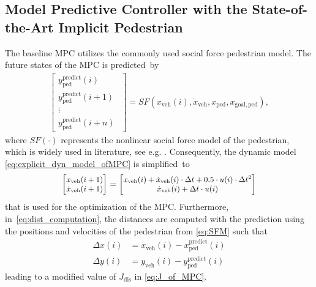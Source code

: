 \documentclass[conference]{IEEEtran}
\begin{document}
	\subsection{Model Predictive Controller with the State-of-the-Art Implicit Pedestrian}
	The baseline MPC utilizes the commonly used social force pedestrian model.
	The future states of the MPC is predicted~by
	\begin{align} \label{eq:SFM}
		\! \! \begin{bmatrix}
			y_\mathrm{ped}^\mathrm{predict}(i) \, \phantom{--} \\
			y_\mathrm{ped}^\mathrm{predict}(i+1) \\
			\vdots \\
			y_\mathrm{ped}^\mathrm{predict}(i+n)
		\end{bmatrix}
		=
		SF(x_\mathrm{veh}(i), \dot{x}_\mathrm{veh}, x_\mathrm{ped}, x_\mathrm{goal,ped}),
	\end{align}
	where $SF(\cdot)$ represents the nonlinear social force model of the pedestrian, which is widely used in literature, see e.g. \cite{1995_SocialForceModel_helbing, 2020_MultiStateSocialForce_yang, 2022_SocialInteractionsAutonomous_wang}. Consequently, the dynamic model \eqref{eq:explicit_dyn_model_ofMPC} is simplified~to
	\begin{equation}
		\small
		\begin{bmatrix}
			x_\mathrm{veh}(i+1) \\
			\dot x_\mathrm{veh}(i+1)\\
		\end{bmatrix}
		=
		\begin{bmatrix}
			x_\mathrm{veh}(i) + \dot x_\mathrm{veh}(i) \cdot {\Delta}t + 0.5 \cdot u(i) \cdot {\Delta}t^{2} \\
			\dot x_\mathrm{veh}(i) + \Delta t \cdot u(i) \\
		\end{bmatrix}
	\end{equation}
	that is used for the optimization of the MPC. Furthermore, in~\eqref{eq:dist_computation}, the distances are computed with the prediction using the positions and velocities of the pedestrian from \eqref{eq:SFM} such that
	\begin{align*} \label{eq:dist_computation_modi}	
		\Delta x(i) &= x_\mathrm{veh}(i) - x^\mathrm{predict}_\mathrm{ped}(i) \\ \Delta y(i) &= y_\mathrm{veh}(i) - y^\mathrm{predict}_\mathrm{ped}(i)
	\end{align*}
	leading to a modified value of $J_\mathrm{dis}$ in \eqref{eq:J_of_MPC}.
	
\end{document}
